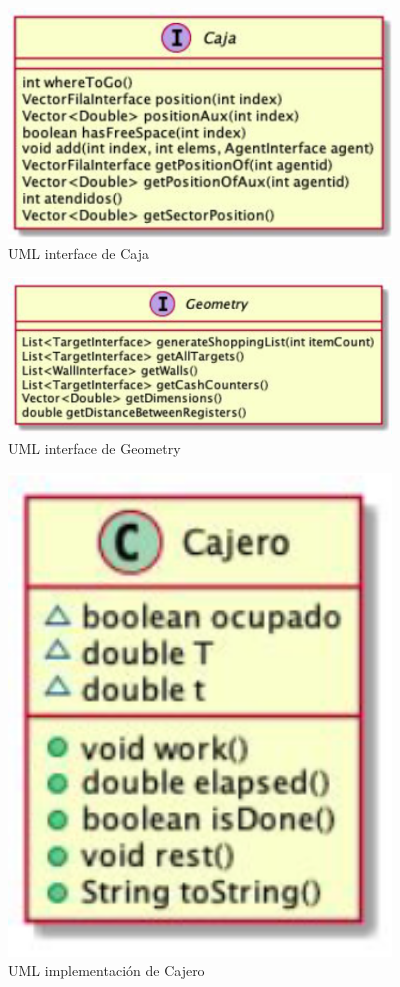 \documentclass{article}
\begin{document}
\begin{figure}[h]
\begin{center}
\includegraphics[width=4in]{./images/interfaceCaja.PNG}
\caption{UML interface de Caja }
\label{interfaceCaja}
\end{center}
\end{figure}

\begin{figure}[h]
\begin{center}
\includegraphics[width=4in]{./images/interfaceGeometry.PNG}
\caption{UML interface de Geometry }
\label{interfaceGeomety}
\end{center}
\end{figure}

\begin{figure}[h]
\begin{center}
\includegraphics[width=4in]{./images/claseCajero.PNG}
\caption{UML implementación de Cajero }
\label{claseCajero}
\end{center}
\end{figure}
\end{document}
